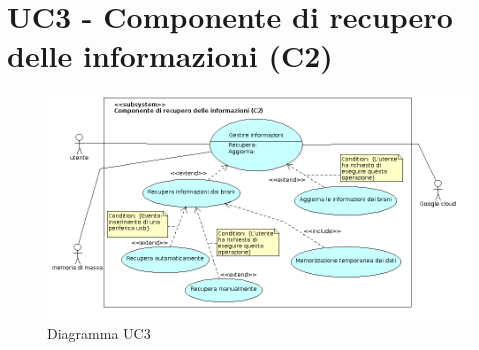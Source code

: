 \section{UC3 - Componente di recupero delle informazioni (C2)}
\begin{figure}[h]
  \centering
  \includegraphics[width=16cm]{img/AR/UC3.png}
\caption{Diagramma UC3}
\end{figure}


